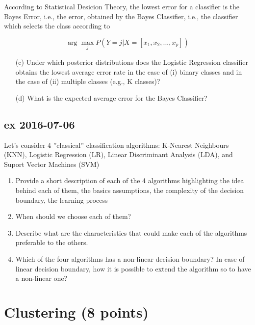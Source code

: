 \documentclass[a4paper,12pt,titlepage]{article} %
\begin{document}
According to Statistical Desicion Theory, the lowest error for a classifier is the Bayes Error, i.e., the error, obtained by the Bayes Classifier, i.e., the classifier which selects the class according to 

$$ \arg \max_{j} P (Y = j | X = [x_{1}, x_{2}, ..., x_{p}]) $$

\begin{itemize}
\item[(c)] Under which posterior distributions does the Logistic Regression classifier obtains the lowest average error rate in the case of (i) binary classes and in the case of (ii) multiple classes (e.g., K classes)?
\item[(d)] What is the expected average error for the Bayes Classifier? 
\end{itemize}

\subsection{ex 2016-07-06}
Let's consider 4 ''classical'' classification algorithms: K-Nearest Neighbours (KNN), Logistic Regression (LR), Linear Discriminant Analysis (LDA), and Suport Vector Machines (SVM)
\begin{enumerate}
\item Provide a short description of each of the 4 algorithms highlighting the idea behind each of them, the basics assumptions, the complexity of the decision boundary, the learning process 
\item When should we choose each of them?
\item Describe what are the characteristics that could make each of the algorithms preferable to the others.
\item Which of the four algorithms has a non-linear decision boundary? In case of linear decision boundary, how it is possible to extend the algorithm so to have a non-linear one?
\end{enumerate}

\newpage
\section{Clustering (8 points)}
\end{document}
